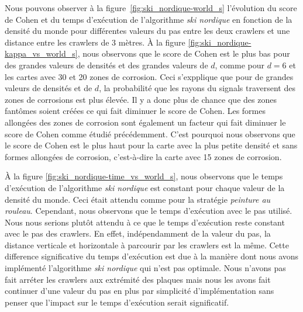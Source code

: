 \documentclass[francais,RandD]{rapportPFE}
\begin{document}
			Nous pouvons observer à la figure~\ref{fig:ski_nordique-world_s} l'évolution du score de Cohen et du temps d'exécution de l'algorithme \textit{ski nordique} en fonction de la densité du monde pour différentes valeurs du pas entre les deux crawlers et une distance entre les crawlers de 3 mètres.
			À la figure \ref{fig:ski_nordique-kappa_vs_world_s}, nous observons que le score de Cohen est le plus bas pour des grandes valeurs de densités et des grandes valeurs de $d$, comme pour $d = 6$ et les cartes avec 30 et 20 zones de corrosion.
			Ceci s'expplique que pour de grandes valeurs de densités et de $d$, la probabilité que les rayons du signals traversent des zones de corrosions est plus élevée.
			Il y a donc plus de chance que des zones fantômes soient créées ce qui fait diminuer le score de Cohen.
			Les formes allongées des zones de corrosion sont également un facteur qui fait diminuer le score de Cohen comme étudié précédemment.
			C'est pourquoi nous observons que le score de Cohen est le plus haut pour la carte avec la plus petite densité et sans formes allongées de corrosion, c'est-à-dire la carte avec 15 zones de corrosion.

			À la figure \ref{fig:ski_nordique-time_vs_world_s}, nous observons que le temps d'exécution de l'algorithme \textit{ski nordique} est constant pour chaque valeur de la densité du monde.
			Ceci était attendu comme pour la stratégie \textit{peinture au rouleau}.
			Cependant, nous observons que le temps d'exécution avec le pas utilisé.
			Nous nous serions plutôt attendu à ce que le temps d'exécution reste constant avec le pas des crawlers.
			En effet, indépendamment de la valeur du pas, la distance verticale et horizontale à parcourir par les crawlers est la même.
			Cette difference significative du temps d'exécution est due à la manière dont nous avons implémenté l'algorithme \textit{ski nordique} qui n'est pas optimale.
			Nous n'avons pas fait arréter les crawlers aux extrémité des plaques mais nous les avons fait continuer d'une valeur du pas en plus par simplicité d'implémentation sans penser que l'impact sur le temps d'exécution serait significatif.
\end{document}
